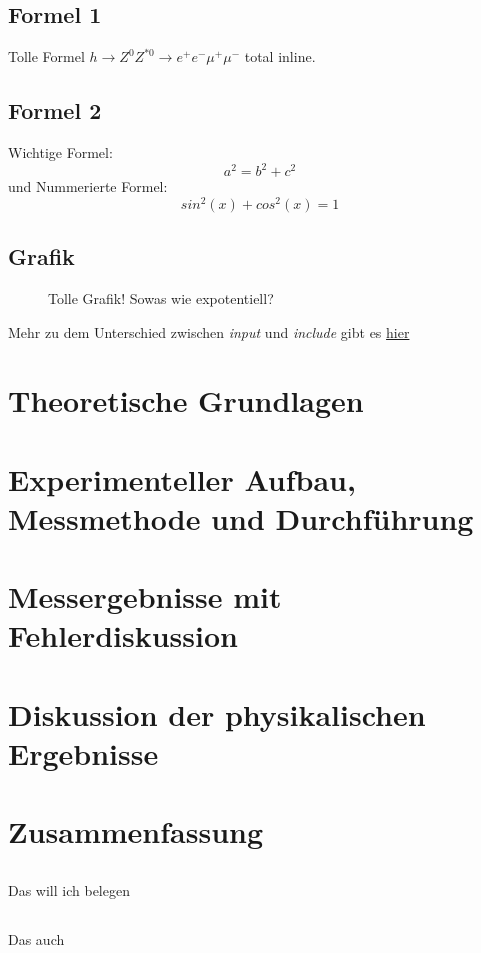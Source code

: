 \documentclass[10pt,a4paper]{article}
\begin{document}
\subsection{Formel 1} Tolle Formel $ h \rightarrow Z^0 Z^{*0} \rightarrow e^+ e^- \mu^+ \mu^- $ total inline.

\subsection{Formel 2} Wichtige Formel:
$$ a^2 = b^2 + c^2 $$
und Nummerierte Formel:
\begin{equation}
sin^2(x)+cos^2(x) = 1
\end{equation}


\subsection{Grafik}
\begin{figure}[h]
\centering


\caption[Parabel]{Tolle Grafik! Sowas wie expotentiell?}
\end{figure}
Mehr zu dem Unterschied zwischen \textit{input} und \textit{include} gibt es \href{http://de.wikibooks.org/wiki/LaTeX-W%C3%B6rterbuch:_include}{hier}



\section{Theoretische Grundlagen}
\section{Experimenteller Aufbau, Messmethode und Durchführung}
\section{Messergebnisse mit Fehlerdiskussion}
\section{Diskussion der physikalischen Ergebnisse}


\section{Zusammenfassung}
\subsection{}  Das will ich belegen \cite[p. 2]{erstesBuch}
\subsection{} Das auch  \cite{link}



\newpage





\newpage
{}
\listoffigures
\end{document}
